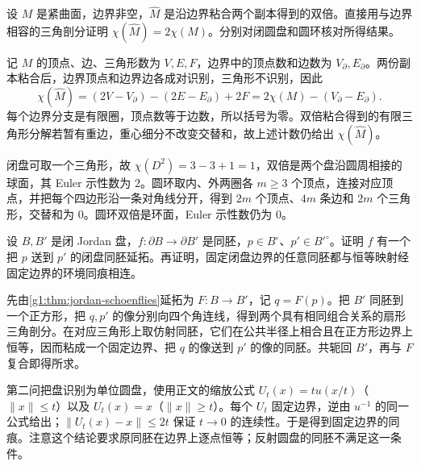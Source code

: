 \begin{exercise}\label{g1:ex:double-euler}
	设 \(M\) 是紧曲面，边界非空，\(\widehat M\) 是沿边界粘合两个副本得到的双倍。直接用与边界相容的三角剖分证明 \(\chi(\widehat M)=2\chi(M)\)。分别对闭圆盘和圆环核对所得结果。
\end{exercise}
\begin{solution}
	记 \(M\) 的顶点、边、三角形数为 \(V,E,F\)，边界中的顶点数和边数为 \(V_\partial,E_\partial\)。两份副本粘合后，边界顶点和边界边各成对识别，三角形不识别，因此
	\[
		\chi(\widehat M)=(2V-V_\partial)-(2E-E_\partial)+2F
		=2\chi(M)-(V_\partial-E_\partial).
	\]
	每个边界分支是有限圈，顶点数等于边数，所以括号为零。双倍粘合得到的有限三角形分解若暂有重边，重心细分不改变交替和，故上述计数仍给出 \(\chi(\widehat M)\)。

	闭盘可取一个三角形，故 \(\chi(D^2)=3-3+1=1\)，双倍是两个盘沿圆周相接的球面，其 Euler 示性数为 \(2\)。圆环取内、外两圈各 \(m\ge3\) 个顶点，连接对应顶点，并把每个四边形沿一条对角线分开，得到 \(2m\) 个顶点、\(4m\) 条边和 \(2m\) 个三角形，交替和为 \(0\)。圆环双倍是环面，Euler 示性数仍为 \(0\)。
\end{solution}

\begin{exercise}\label{g1:ex:disk-two-marked-points}
	设 \(B,B'\) 是闭 Jordan 盘，\(f:\partial B\to\partial B'\) 是同胚，\(p\in B^\circ\)、\(p'\in B'^\circ\)。证明 \(f\) 有一个把 \(p\) 送到 \(p'\) 的闭盘同胚延拓。再证明，固定闭盘边界的任意同胚都与恒等映射经固定边界的环境同痕相连。
\end{exercise}
\begin{solution}
	先由\cref{g1:thm:jordan-schoenflies}延拓为 \(F:B\to B'\)，记 \(q=F(p)\)。把 \(B'\) 同胚到一个正方形，把 \(q,p'\) 的像分别向四个角连线，得到两个具有相同组合关系的扇形三角剖分。在对应三角形上取仿射同胚，它们在公共半径上相合且在正方形边界上恒等，因而粘成一个固定边界、把 \(q\) 的像送到 \(p'\) 的像的同胚。共轭回 \(B'\)，再与 \(F\) 复合即得所求。

	第二问把盘识别为单位圆盘，使用正文的缩放公式 \(U_t(x)=tu(x/t)\)（\(\|x\|\le t\)）以及 \(U_t(x)=x\)（\(\|x\|\ge t\)）。每个 \(U_t\) 固定边界，逆由 \(u^{-1}\) 的同一公式给出；\(\|U_t(x)-x\|\le2t\) 保证 \(t\to0\) 的连续性。于是得到固定边界的同痕。注意这个结论要求原同胚在边界上逐点恒等；反射圆盘的同胚不满足这一条件。
\end{solution}

